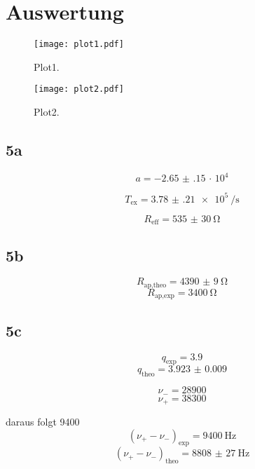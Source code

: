 \section{Auswertung}
\label{sec:Auswertung}

\begin{figure}
  \centering
  \texttt{[image: plot1.pdf]}
  \caption{Plot1.}
  \label{fig:plot1}
\end{figure}

\begin{figure}
  \centering
  \texttt{[image: plot2.pdf]}
  \caption{Plot2.}
  \label{fig:plot2}
\end{figure}


\subsection{5a}
\begin{equation}
   a = \num{-2.65(15)}\, \cdot\, 10^{4}
\end{equation}

\begin{equation}
   T_{\text{ex}} = \SI{3.78(21)e5}{\per\second}
\end{equation}

\begin{equation}
R_{\text{eff}} = \SI{535(30)}{\ohm}
\end{equation}


\subsection{5b}

\begin{equation}
  R_{\text{ap,theo}} = \SI{4390(9)}{\ohm}
  \end{equation}
\begin{equation}
  R_{\text{ap,exp}} = \SI{3400}{\ohm}
\end{equation}


\subsection{5c}

\begin{equation}
  q_{\text{exp}} = 3.9
\end{equation}
\begin{equation}
  q_{\text{theo}} = \num{3.923(9)}
\end{equation}



\begin{equation}
  \nu_{-} = 28900
\end{equation}
\begin{equation}
  \nu_{+} = 38300
\end{equation}

daraus folgt 9400
\begin{equation}
  (\nu_{+}-\nu_{-})_{\text{exp}} = \SI{9400}{\hertz}
\end{equation}
\begin{equation}
  (\nu_{+}-\nu_{-})_{\text{theo}} = \SI{8808(27)}{\hertz}
\end{equation}

